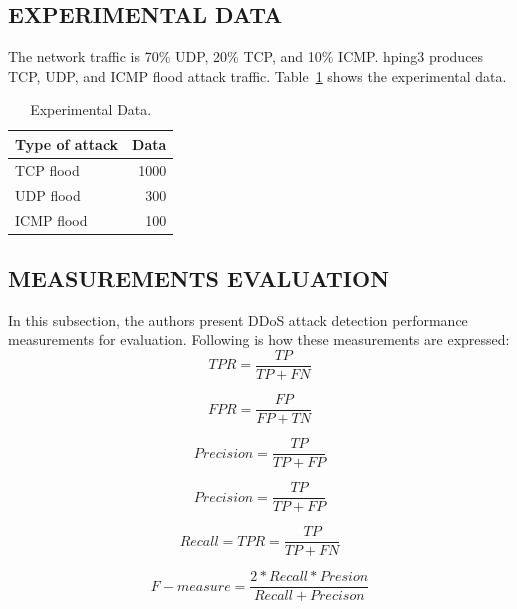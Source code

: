 \documentclass[12pt]{report}
\begin{document}
\subsection{EXPERIMENTAL DATA}
The network traffic is 70\% UDP, 20\% TCP, and 10\% ICMP. hping3 produces TCP, UDP, and ICMP flood attack traffic. Table~\ref{tab:exdata} shows the experimental data. 

\begin{table}[H]
    \centering
    \begin{tabular}{l r}
    \toprule
    Type of attack & Data \\
    \midrule
    TCP flood & 1000 \\
    UDP flood & 300  \\
    ICMP flood & 100 \\
    \bottomrule
    \end{tabular}
    \caption{Experimental Data.}
    \label{tab:exdata}
\end{table}


\subsection{MEASUREMENTS EVALUATION}
In this subsection, the authors present DDoS attack detection performance measurements for evaluation. Following is how these measurements are expressed: \\ 

\begin{equation}
    {TPR=\frac{TP}{TP+FN}}
    \label{eqn:eqn11}
\end{equation}

\begin{equation}
    {FPR=\frac{FP}{FP+TN}}
    \label{eqn:eqn12}
\end{equation}

\begin{equation}
    {Precision = \frac{TP}{TP+FP}}
    \label{eqn:eqn13}
\end{equation}

\begin{equation}
    {Precision = \frac{TP}{TP+FP}}
    \label{eqn:eqn14}
\end{equation}

\begin{equation}
    {Recall = TPR = \frac{TP}{TP+FN}}
    \label{eqn:eqn15}
\end{equation}

\begin{equation}
    {F - measure = \frac{2*Recall*Presion}{Recall+Precison}}
    \label{eqn:eqn15}
\end{equation}
\end{document}
